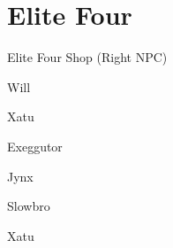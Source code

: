 \chapter{Elite Four}
\vspace{0.5mm}

\begin{paracol}{2}
\begin{shop}{Elite Four Shop (Right NPC)}
	\varwb
	\begin{buy}
		\item \shopHl{(\pointDown)} \maxRepel{} 
		\item \shopHl{(3\pointDown)} \fullRestore{} 
		\item \shopHl{(\pointDown)} \revive{} 
	\end{buy}
	\varwe
\end{shop}

\begin{boss}{Will}
	\varwb
	\begin{fightSection}{Xatu}
		\item \xSpecial
		\item {}
		\begin{notes}
			\item {}
		\end{notes}
		\item {} \surf
	\end{fightSection}
	\begin{fightSection}{Exeggutor}
		\item {} \icePunch
	\end{fightSection}
	\begin{fightSection}{Jynx}
		\item {} \strength
	\end{fightSection}
	\begin{fightSection}{Slowbro}
		\item {} \return{} 
	\end{fightSection}
	\begin{fightSection}{Xatu}
		\item {} \surf
	\end{fightSection}
	\varwe
\end{boss}


\end{paracol}
